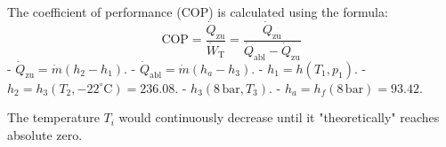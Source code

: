 The coefficient of performance (COP) is calculated using the formula:  
\[ \text{COP} = \frac{\dot{Q}_{\text{zu}}}{\dot{W}_{\text{T}}} = \frac{\dot{Q}_{\text{zu}}}{\dot{Q}_{\text{abl}} - \dot{Q}_{\text{zu}}} \]  
- \( \dot{Q}_{\text{zu}} = \dot{m} (h_2 - h_1) \).  
- \( \dot{Q}_{\text{abl}} = \dot{m} (h_a - h_3) \).  
- \( h_1 = h(T_1, p_1) \).  
- \( h_2 = h_3(T_2, -22^\circ \text{C}) = 236.08 \).  
- \( h_3(8 \, \text{bar}, T_3) \).  
- \( h_a = h_f(8 \, \text{bar}) = 93.42 \).

The temperature \( T_i \) would continuously decrease until it "theoretically" reaches absolute zero.